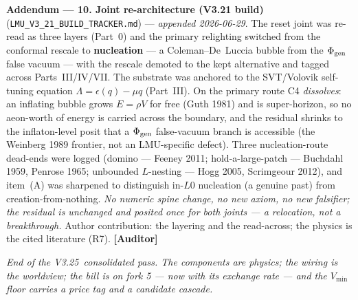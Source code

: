\documentclass[11pt]{article}
\newcommand{\lmuver}{3.25}
\newcommand{\Auditor}{\textbf{\textcolor{teal!55!black}{[Auditor]}}}
\begin{document}
\smallskip\noindent\textbf{Addendum --- 10. Joint re-architecture (V3.21 build)} (\texttt{LMU\_V3\_21\_BUILD\_TRACKER.md}) --- \emph{appended 2026-06-29}. The reset joint was re-read as three layers (Part~0) and the primary relighting switched from the conformal rescale to \textbf{nucleation} --- a Coleman--De~Luccia bubble from the $\Phi_{\rm gen}$ false vacuum --- with the rescale demoted to the kept alternative and tagged across Parts~III/IV/VII. The substrate was anchored to the SVT/Volovik self-tuning equation $\Lambda=\epsilon(q)-\mu q$ (Part~III). On the primary route C4 \emph{dissolves}: an inflating bubble grows $E=\rho V$ for free (Guth 1981) and is super-horizon, so no aeon-worth of energy is carried across the boundary, and the residual shrinks to the inflaton-level posit that a $\Phi_{\rm gen}$ false-vacuum branch is accessible (the Weinberg 1989 frontier, not an LMU-specific defect). Three nucleation-route dead-ends were logged (domino --- Feeney 2011; hold-a-large-patch --- Buchdahl 1959, Penrose 1965; unbounded $L$-nesting --- Hogg 2005, Scrimgeour 2012), and item~(A) was sharpened to distinguish in-$L0$ nucleation (a genuine past) from creation-from-nothing. \emph{No numeric spine change, no new axiom, no new falsifier; the residual is unchanged and posited once for both joints --- a relocation, not a breakthrough.} Author contribution: the layering and the read-across; the physics is the cited literature (R7). \Auditor

\vspace{6pt}\centering\small\textit{End of the V\lmuver\ consolidated pass. The components are physics; the wiring is the worldview; the bill is on fork 5 --- now with its exchange rate --- and the $V_{\min}$ floor carries a price tag and a candidate cascade.}
\end{document}
